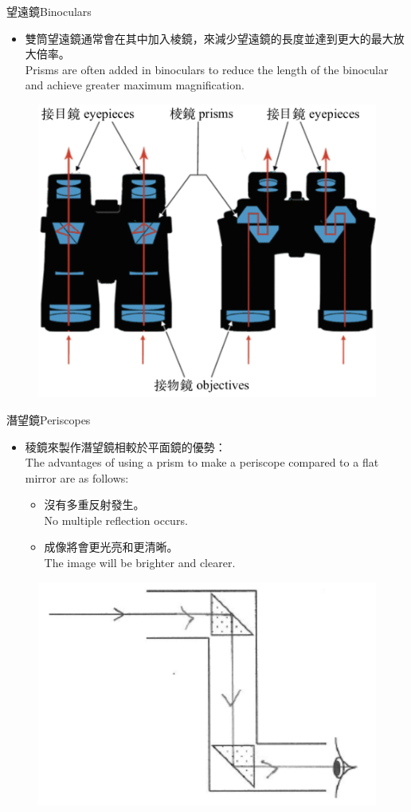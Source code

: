 \documentclass[beamer=true]{standalone}
\begin{document}
\begin{frame}{望遠鏡Binoculars}
    \begin{itemize}
        \item 雙筒望遠鏡通常會在其中加入棱鏡，來減少望遠鏡的長度並達到更大的最大放大倍率。\\Prisms are often added in binoculars to reduce the length of the binocular and achieve greater maximum magnification.
    \end{itemize}
    \begin{figure}
        \centering
        \includegraphics[width=0.58\linewidth]{assets/dun892u983n928dn82u3c.png}
        
        
    \end{figure}
\end{frame}

\begin{frame}{潛望鏡Periscopes}
\begin{itemize}
    \item 稜鏡來製作潛望鏡相較於平面鏡的優勢：\\The advantages of using a prism to make a periscope compared to a flat mirror are as follows:
    \begin{itemize}
        \item 沒有多重反射發生。\\No multiple reflection occurs.
        \item 成像將會更光亮和更清晰。\\The image will be brighter and clearer.
    \end{itemize}
\end{itemize}
    \begin{figure}
        \centering
        \includegraphics[width=0.5\linewidth]{assets/dqwdjmd9n0d98329bdy872yd.png}
    \end{figure}
\end{frame}
\end{document}

